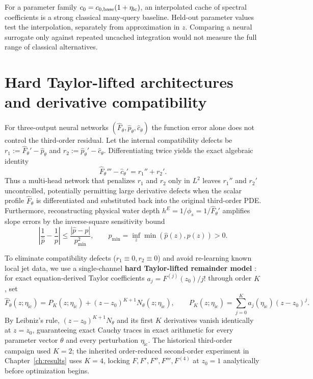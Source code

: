 \documentclass[11pt,a4paper,oneside]{report}
\numberwithin{equation}{chapter}
\begin{document}
For a parameter family $c_0=c_{0,\rm base}(1+\eta_{\rm ic})$, an interpolated cache of spectral coefficients is a strong classical many-query baseline. Held-out parameter values test the interpolation, separately from approximation in $z$. Comparing a neural surrogate only against repeated uncached integration would not measure the full range of classical alternatives.

\section{Hard Taylor-lifted architectures and derivative compatibility}
For three-output neural networks $(\widehat{F}_\theta,\widehat{p}_\theta,\widehat{c}_\theta)$ the function error alone does not control the third-order residual. Let the internal compatibility defects be $r_1 := \widehat{F}_\theta' - \widehat{p}_\theta$ and $r_2 := \widehat{p}_\theta' - \widehat{c}_\theta$. Differentiating twice yields the exact algebraic identity
\begin{equation}\label{eq:deriv_incompat}
\widehat{F}_\theta''' - \widehat{c}_\theta' = r_1'' + r_2'.
\end{equation}
Thus a multi-head network that penalizes $r_1$ and $r_2$ only in $L^2$ leaves $r_1''$ and $r_2'$ uncontrolled, potentially permitting large derivative defects when the scalar profile $\widehat{F}_\theta$ is differentiated and substituted back into the original third-order PDE. Furthermore, reconstructing physical water depth $h^E = 1/\phi_s = 1/\widehat{F}_\theta'$ amplifies slope errors by the inverse-square sensitivity bound
\begin{equation}
\left|\frac{1}{\widehat{p}} - \frac{1}{p}\right| \le \frac{|\widehat{p}-p|}{p_{\min}^2},\qquad
p_{\min} = \inf_z \min(\widehat{p}(z),p(z)) > 0.
\end{equation}

To eliminate compatibility defects ($r_1\equiv 0, r_2\equiv 0$) and avoid re-learning known local jet data, we use a single-channel \textbf{hard Taylor-lifted remainder model} \cite{lagaris}: for exact equation-derived Taylor coefficients $a_j = F^{(j)}(z_0)/j!$ through order $K$, set
\begin{equation}\label{eq:hardprofile}
\widehat F_\theta(z;\eta_{\mathrm{ic}})=P_K(z;\eta_{\mathrm{ic}})
 +(z-z_0)^{K+1}N_\theta(z;\eta_{\mathrm{ic}}),\qquad
 P_K(z;\eta_{\mathrm{ic}})=\sum_{j=0}^K a_j(\eta_{\mathrm{ic}})(z-z_0)^j.
\end{equation}
By Leibniz's rule, $(z-z_0)^{K+1}N_\theta$ and its first $K$ derivatives vanish identically at $z=z_0$, guaranteeing exact Cauchy traces in exact arithmetic for every parameter vector $\theta$ and every perturbation $\eta_{\mathrm{ic}}$. The historical third-order campaign used $K=2$; the inherited order-reduced second-order experiment in Chapter~\ref{ch:results} uses $K=4$, locking $F,F',F'',F''',F^{(4)}$ at $z_0=1$ analytically before optimization begins.
\end{document}
